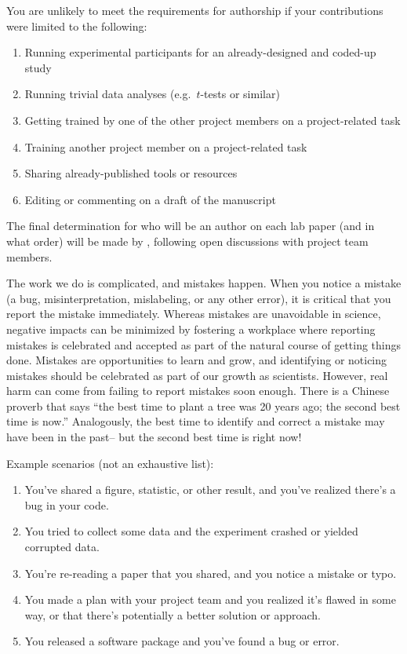 \documentclass{tufte-book} %
\begin{document}
You are unlikely to meet the requirements for authorship if your
contributions were limited to the following:
\begin{enumerate}
  \item Running experimental participants for an already-designed and
    coded-up study
  \item Running trivial data analyses (e.g.\ $t$-tests or similar)
  \item Getting trained by one of the other project members on a
    project-related task
  \item Training another project member on a project-related task
  \item Sharing already-published tools or resources
  \item Editing or commenting on a draft of the manuscript
\end{enumerate}

The final determination for who will be an author on each lab paper
(and in what order) will be made by \director, following open
discussions with project team members.


\noindent The work we do is complicated, and mistakes happen.  When
you notice a mistake (a bug, misinterpretation, mislabeling, or any
other error), it is critical that you report the mistake immediately.
Whereas mistakes are unavoidable in science, negative impacts can be
minimized by fostering a workplace where reporting mistakes is
celebrated and accepted as part of the natural course of getting
things done.  Mistakes are opportunities to learn and grow, and
identifying or noticing mistakes should be celebrated as part of our
growth as scientists.  However, real harm can come from failing to
report mistakes soon enough.  There is a Chinese proverb that says
``the best time to plant a tree was 20 years ago; the second best time
is now.''  Analogously, the best time to identify and correct a
mistake may have been in the past-- but the second best time is right now!

Example scenarios (not an exhaustive list):
\begin{enumerate}
  \item You've shared a figure, statistic, or other result, and
    you've realized there's a bug in your code.
  \item You tried to collect some data and the experiment crashed or
    yielded corrupted data.
  \item You're re-reading a paper that you shared, and you notice a
    mistake or typo.
  \item You made a plan with your project team and you realized it's
    flawed in some way, or that there's potentially a better solution
    or approach.
  \item You released a software package and you've found a bug or error.
\end{enumerate}
\end{document}
